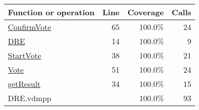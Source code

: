 \bigskip
\begin{longtable}{|l|r|r|r|}
\hline
Function or operation & Line & Coverage & Calls \\
\hline
\hline
\hyperref[ConfirmVote:65]{ConfirmVote} & 65&100.0\% & 24 \\
\hline
\hyperref[DRE:14]{DRE} & 14&100.0\% & 9 \\
\hline
\hyperref[StartVote:38]{StartVote} & 38&100.0\% & 21 \\
\hline
\hyperref[Vote:51]{Vote} & 51&100.0\% & 24 \\
\hline
\hyperref[getResult:34]{getResult} & 34&100.0\% & 15 \\
\hline
\hline
DRE.vdmpp & & 100.0\% & 93 \\
\hline
\end{longtable}

